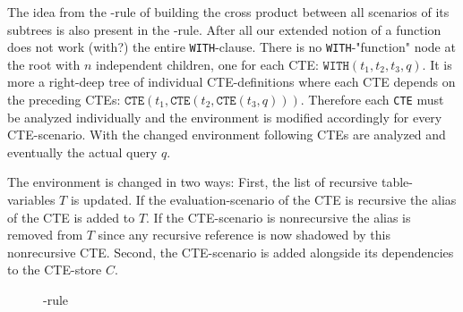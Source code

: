The idea from the \REXPR-rule of building the cross product between all scenarios of its subtrees is also present in the \RCTE-rule. After all our extended notion of a function does not work (with?) the entire \texttt{WITH}-clause. There is no \texttt{WITH}-"function" node at the root with $n$ independent children, one for each CTE: $\texttt{WITH}(t_1, t_2, t_3, q)$. It is more a right-deep tree of individual CTE-definitions where each CTE depends on the preceding CTEs: $\texttt{CTE}(t_1, \texttt{CTE}(t_2, \texttt{CTE}(t_3, q)))$. Therefore each \texttt{CTE} must be analyzed individually and the environment is modified accordingly for every CTE-scenario. With the changed environment following CTEs are analyzed and eventually the actual query $q$.

The environment is changed in two ways: First, the list of recursive table-variables $T$ is updated. If the evaluation-scenario of the CTE is recursive the alias of the CTE is added to $T$. If the CTE-scenario is nonrecursive the alias is removed from $T$ since any recursive reference is now shadowed by this nonrecursive CTE. Second, the CTE-scenario is added alongside its dependencies to the CTE-store $C$.

\begin{figure}[h!]
    \centering\footnotesize
{}
    \caption{\RCTE-rule}
    \label{rule:cte}
\end{figure}

